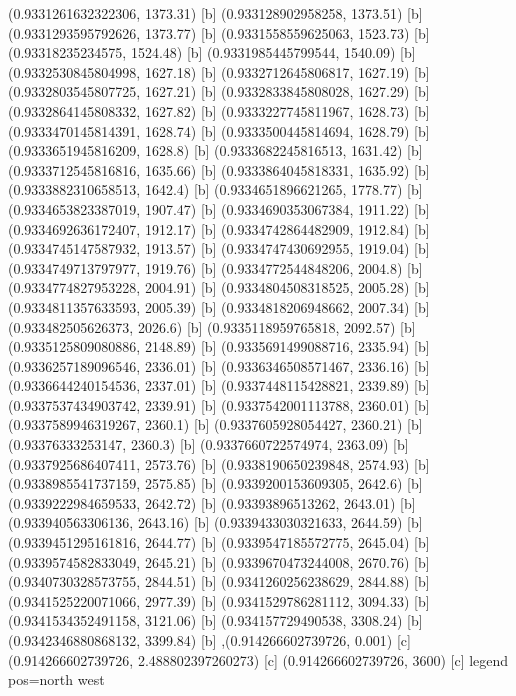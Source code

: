 {{{(0.9331261632322306, 1373.31) [b] 
(0.933128902958258, 1373.51) [b] 
(0.9331293595792626, 1373.77) [b] 
(0.9331558559625063, 1523.73) [b] 
(0.93318235234575, 1524.48) [b] 
(0.9331985445799544, 1540.09) [b] 
(0.9332530845804998, 1627.18) [b] 
(0.9332712645806817, 1627.19) [b] 
(0.9332803545807725, 1627.21) [b] 
(0.9332833845808028, 1627.29) [b] 
(0.9332864145808332, 1627.82) [b] 
(0.9333227745811967, 1628.73) [b] 
(0.9333470145814391, 1628.74) [b] 
(0.9333500445814694, 1628.79) [b] 
(0.9333651945816209, 1628.8) [b] 
(0.9333682245816513, 1631.42) [b] 
(0.9333712545816816, 1635.66) [b] 
(0.9333864045818331, 1635.92) [b] 
(0.9333882310658513, 1642.4) [b] 
(0.9334651896621265, 1778.77) [b] 
(0.9334653823387019, 1907.47) [b] 
(0.9334690353067384, 1911.22) [b] 
(0.9334692636172407, 1912.17) [b] 
(0.9334742864482909, 1912.84) [b] 
(0.9334745147587932, 1913.57) [b] 
(0.9334747430692955, 1919.04) [b] 
(0.9334749713797977, 1919.76) [b] 
(0.9334772544848206, 2004.8) [b] 
(0.9334774827953228, 2004.91) [b] 
(0.9334804508318525, 2005.28) [b] 
(0.9334811357633593, 2005.39) [b] 
(0.9334818206948662, 2007.34) [b] 
(0.933482505626373, 2026.6) [b] 
(0.9335118959765818, 2092.57) [b] 
(0.9335125809080886, 2148.89) [b] 
(0.9335691499088716, 2335.94) [b] 
(0.9336257189096546, 2336.01) [b] 
(0.9336346508571467, 2336.16) [b] 
(0.9336644240154536, 2337.01) [b] 
(0.9337448115428821, 2339.89) [b] 
(0.9337537434903742, 2339.91) [b] 
(0.9337542001113788, 2360.01) [b] 
(0.9337589946319267, 2360.1) [b] 
(0.9337605928054427, 2360.21) [b] 
(0.93376333253147, 2360.3) [b] 
(0.9337660722574974, 2363.09) [b] 
(0.9337925686407411, 2573.76) [b] 
(0.9338190650239848, 2574.93) [b] 
(0.9338985541737159, 2575.85) [b] 
(0.9339200153609305, 2642.6) [b] 
(0.9339222984659533, 2642.72) [b] 
(0.93393896513262, 2643.01) [b] 
(0.933940563306136, 2643.16) [b] 
(0.9339433030321633, 2644.59) [b] 
(0.9339451295161816, 2644.77) [b] 
(0.9339547185572775, 2645.04) [b] 
(0.9339574582833049, 2645.21) [b] 
(0.9339670473244008, 2670.76) [b] 
(0.9340730328573755, 2844.51) [b] 
(0.9341260256238629, 2844.88) [b] 
(0.9341525220071066, 2977.39) [b] 
(0.9341529786281112, 3094.33) [b] 
(0.9341534352491158, 3121.06) [b] 
(0.934157729490538, 3308.24) [b] 
(0.9342346880868132, 3399.84) [b] 
},{(0.914266602739726, 0.001) [c] 
(0.914266602739726, 2.488802397260273) [c] 
(0.914266602739726, 3600) [c] 
}}}{legend pos=north west}